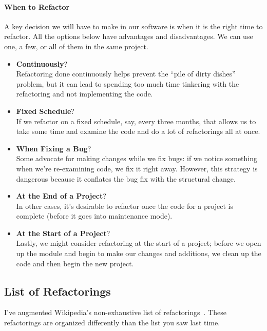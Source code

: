 \paragraph{When to Refactor} A key decision we will have to make in our software is when it is the right time to refactor. All the options below have advantages and disadvantages. We can use one, a few, or all of them in the same project.

\begin{itemize}
	\item \textbf{Continuously}?\\
	Refactoring done continuously helps prevent the ``pile of dirty dishes'' problem, but it can lead to spending too much time tinkering with the refactoring and not implementing the code. 
	\item \textbf{Fixed Schedule}?\\
	If we refactor on a fixed schedule, say, every three months, that allows us to take some time and examine the code and do a lot of refactorings all at once. 
	\item \textbf{When Fixing a Bug}?\\
	Some advocate for making changes while we fix bugs: if we notice something when we're re-examining code, we fix it right away. However, this strategy is dangerous because it conflates the bug fix with the structural change. 
	\item \textbf{At the End of a Project}?\\
	In other cases, it's desirable to refactor once the code for a project is complete (before it goes into maintenance mode). 
	\item \textbf{At the Start of a Project}?\\
	Lastly, we might consider refactoring at the start of a project; before we open up the module and begin to make our changes and additions, we clean up the code and then begin the new project.
\end{itemize}

\subsection*{List of Refactorings} 

I've augmented Wikipedia's 
non-exhaustive list of
refactorings~\cite{wiki:refactoring}. These refactorings are organized differently 
than the list you saw last time.

